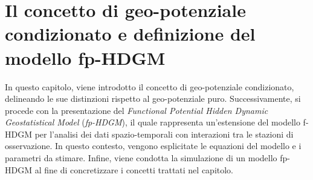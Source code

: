 \chapter[Il concetto di geo-potenziale condizionato e il modello fp-HDGM]{Il concetto di geo-potenziale condizionato e definizione del modello fp-HDGM}
In questo capitolo, viene introdotto il concetto di geo-potenziale condizionato, delineando le sue distinzioni rispetto al geo-potenziale puro. Successivamente, si procede con la presentazione del \textit{Functional Potential Hidden Dynamic Geostatistical Model} (\textit{fp-HDGM}), il quale rappresenta un'estensione del modello f-HDGM per l'analisi dei dati spazio-temporali con interazioni tra le stazioni di osservazione. In questo contesto, vengono esplicitate le equazioni del modello e i parametri da stimare. Infine, viene condotta la simulazione di un modello fp-HDGM al fine di concretizzare i concetti trattati nel capitolo.

